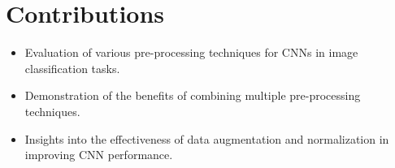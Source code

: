 \documentclass{article}
\begin{document}
\section{Contributions}
\begin{itemize}
    \item Evaluation of various pre-processing techniques for CNNs in image classification tasks.
    \item Demonstration of the benefits of combining multiple pre-processing techniques.
    \item Insights into the effectiveness of data augmentation and normalization in improving CNN performance.
\end{itemize}



\end{document}
